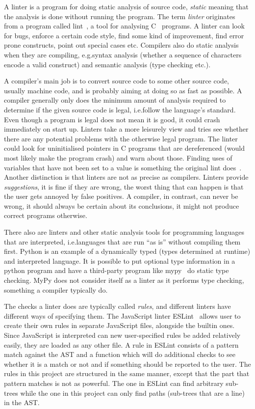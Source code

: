 \documentclass[a4paper,12pt]{article}
\begin{document}
A linter is a program for doing static analysis of source code, \emph{static} meaning that
the analysis is done without running the program. The term \emph{linter} originates from a
program called lint~\cite{lint}, a tool for analysing C~\cite{c1978} programs. A linter can look for
bugs, enforce a certain code style, find some kind of improvement, find error prone
constructs, point out special cases etc. Compilers also do static analysis when they are
compiling, e.g.\@ syntax analysis (whether a sequence of characters encode a valid
construct) and semantic analysis (type checking etc.\@).

A compiler's main job is to convert source code to some other source code, usually machine
code, and is probably aiming at doing so as fast as possible. A compiler generally only
does the minimum amount of analysis required to determine if the given source code is
legal, i.e.\@ follow the language's standard. Even though a program is legal does not mean
it is good, it could crash immediately on start up. Linters take a more leisurely view and
tries see whether there are any potential problems with the otherwise legal program. The
linter could look for uninitialised pointers in C programs that are dereferenced (would most likely make
the program crash) and warn about those. Finding uses of variables that have not been set
to a value is something the original lint does~\cite{lint}. Another distinction is that
linters are not as precise as compilers. Linters provide \emph{suggestions}, it is fine if
they are wrong, the worst thing that can happen is that the user gets annoyed by false
positives. A compiler, in contrast, can never be wrong, it should always be certain about
its conclusions, it might not produce correct programs otherwise.

There also are linters and other static analysis tools for
programming languages that are
interpreted, i.e.\@ languages that are run ``as is'' without compiling them first. Python
is an example of a dynamically typed (types determined at runtime) and interpreted
language. It is possible to put optional type information in a python program and have a
third-party program like mypy~\cite{mypy} do static type checking. MyPy does not
consider itself as a linter as it performs type checking, something a compiler typically
do.

The checks a linter does are typically called \emph{rules}, and different linters have
different ways of specifying them. The JavaScript linter ESLint~\cite{ESLint} allows user
to create their own rules in separate JavaScript files, alongside the builtin ones.
Since JavaScript is interpreted can new user-specified rules be added relatively easily,
they are loaded as any other file.
A rule in ESLint
consists of a pattern match against the AST and a function
which will do additional checks to see whether it is a match or not and if something
should be reported to the user. The rules in this project are structured in the same
manner, except that the part that pattern matches is not as powerful. The one in ESLint can
find arbitrary sub-trees while the one in this project can only find paths (sub-trees that
are a line) in the AST.
\end{document}
